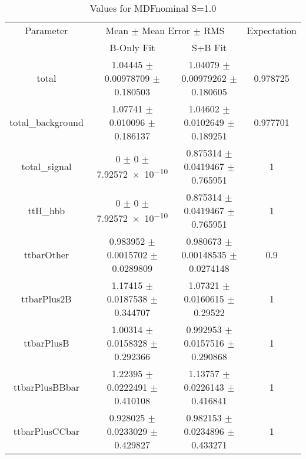 \begin{table}
\centering
\caption{Values for MDFnominal S=1.0}
\begin{tabular}{cccc}
\toprule
Parameter & \multicolumn{2}{c}{Mean $\pm$ Mean Error $\pm$ RMS} & Expectation\\
 & B-Only Fit & S+B Fit & \\
\midrule
total & \num{1.04445} $\pm$ \num{0.00978709} $\pm$ \num{0.180503} & \num{1.04079} $\pm$ \num{0.00979262} $\pm$ \num{0.180605} & \num{0.978725}\\
total\_background & \num{1.07741} $\pm$ \num{0.010096} $\pm$ \num{0.186137} & \num{1.04602} $\pm$ \num{0.0102649} $\pm$ \num{0.189251} & \num{0.977701}\\
total\_signal & \num{0} $\pm$ \num{0} $\pm$ \num{7.92572e-10} & \num{0.875314} $\pm$ \num{0.0419467} $\pm$ \num{0.765951} & \num{1}\\
ttH\_hbb & \num{0} $\pm$ \num{0} $\pm$ \num{7.92572e-10} & \num{0.875314} $\pm$ \num{0.0419467} $\pm$ \num{0.765951} & \num{1}\\
ttbarOther & \num{0.983952} $\pm$ \num{0.0015702} $\pm$ \num{0.0289809} & \num{0.980673} $\pm$ \num{0.00148535} $\pm$ \num{0.0274148} & \num{0.9}\\
ttbarPlus2B & \num{1.17415} $\pm$ \num{0.0187538} $\pm$ \num{0.344707} & \num{1.07321} $\pm$ \num{0.0160615} $\pm$ \num{0.29522} & \num{1}\\
ttbarPlusB & \num{1.00314} $\pm$ \num{0.0158328} $\pm$ \num{0.292366} & \num{0.992953} $\pm$ \num{0.0157516} $\pm$ \num{0.290868} & \num{1}\\
ttbarPlusBBbar & \num{1.22395} $\pm$ \num{0.0222491} $\pm$ \num{0.410108} & \num{1.13757} $\pm$ \num{0.0226143} $\pm$ \num{0.416841} & \num{1}\\
ttbarPlusCCbar & \num{0.928025} $\pm$ \num{0.0233029} $\pm$ \num{0.429827} & \num{0.982153} $\pm$ \num{0.0234896} $\pm$ \num{0.433271} & \num{1}\\
\bottomrule
\end{tabular}
\end{table}